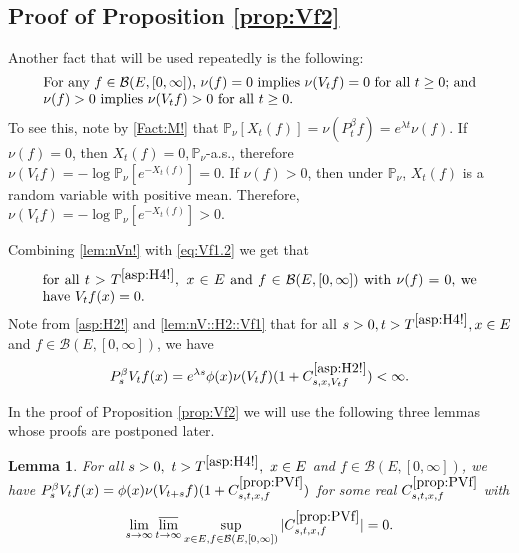 \documentclass[12pt,a4paper]{amsart}
\numberwithin{equation}{section}
\theoremstyle{plain}
\newtheorem{lem}[thm]{Lemma}
\theoremstyle{definition}
\theoremstyle{remark}
\begin{document}
\subsection{Proof of Proposition \ref{prop:Vf2}} \label{sec:Vf2}
	Another fact that will be used repeatedly is the following:
\begin{equation}
\begin{minipage}{0.9\textwidth}
	For any $f\in \mathcal B(E,[0,\infty])$, $\nu(f) = 0$ implies $\nu(V_tf)=0$ for all $t\ge 0$; and $\nu(f)>0$ implies $\nu(V_tf)>0$ for all $t\ge 0$.
\end{minipage}\label{lem:nVn!}
\end{equation}
	To see this, note by \eqref{Fact:M!} that $ \mathbb P_\nu[X_t(f)] = \nu (P_t^\beta f) = e^{\lambda t}\nu (f). $
	If $\nu(f) = 0$, then $X_t(f)=0, \mathbb P_\nu$-a.s., therefore $\nu(V_t f) = - \log \mathbb P_\nu[e^{-X_t(f)}] =0. $
	If $\nu(f) > 0$, then under $\mathbb P_\nu$, $X_t(f)$ is a random variable with positive mean.
	Therefore, $ \nu(V_tf) = - \log \mathbb P_\nu[e^{-X_t(f)}] >0$.

	Combining \eqref{lem:nVn!} with \eqref{eq:Vf1.2} we get that
\begin{equation}
\begin{minipage}{0.9\textwidth}
	for all $t>T^{\eqref{asp:H4!}},~x\in E$ and $f \in \mathcal B(E,[0,\infty])$ with $\nu(f) = 0$, we have $V_t f(x ) = 0$.
\end{minipage} \label{lem:nullVf}
\end{equation}
Note  from \eqref{asp:H2!} and \eqref{lem:nV::H2::Vf1} that for all $s>0, t> T^{\eqref{asp:H4!}}, x\in E$ and $f\in \mathcal B(E,[0,\infty])$, we have
\begin{equation}
	P_s^\beta V_tf(x)  =e^{\lambda s} \phi(x)\nu(V_tf) (1+C^{\eqref{asp:H2!}}_{s,x,V_tf}) <\infty.
\label{lem:PV}
\end{equation}

	In the proof of Proposition \ref{prop:Vf2} we will use the following three lemmas whose proofs are postponed later.

\begin{lem} \label{prop:PVf}
	For all $s> 0,~t> T^{\eqref{asp:H4!}},~ x\in E$ and $f\in \mathcal B(E,[0,\infty])$, we have $P_s^\beta V_t f(x) = \phi(x) \nu(V_{t+s}f) (1+C^{\ref{prop:PVf}}_{s,t,x,f})$ for some real $C^{\ref{prop:PVf}}_{s,t,x,f}$ with
	\[\lim_{s\to \infty} \varlimsup_{t\to \infty} \sup_{x\in E, f\in \mathcal B(E,[0,\infty])}
	|C^{\ref{prop:PVf}}_{s,t,x,f}| = 0.\]
\end{lem}
\end{document}
